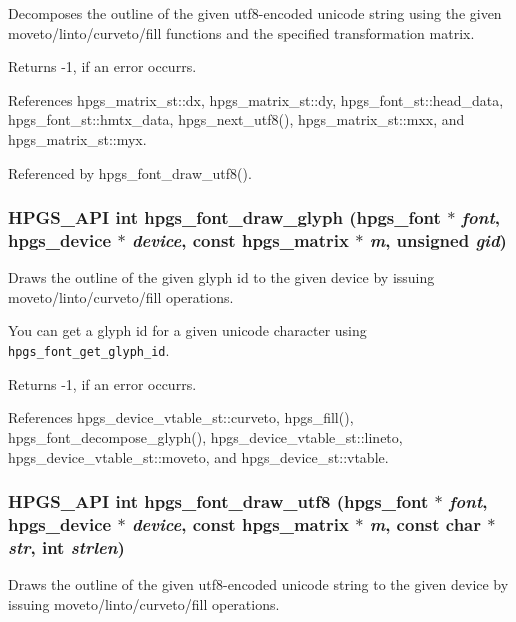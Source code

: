 Decomposes the outline of the given utf8-encoded unicode string using the given moveto/linto/curveto/fill functions and the specified transformation matrix.

Returns -1, if an error occurrs. 

References hpgs\_\-matrix\_\-st::dx, hpgs\_\-matrix\_\-st::dy, hpgs\_\-font\_\-st::head\_\-data, hpgs\_\-font\_\-st::hmtx\_\-data, hpgs\_\-next\_\-utf8(), hpgs\_\-matrix\_\-st::mxx, and hpgs\_\-matrix\_\-st::myx.

Referenced by hpgs\_\-font\_\-draw\_\-utf8().
\subsubsection[hpgs\_\-font\_\-draw\_\-glyph]{\setlength{\rightskip}{0pt plus 5cm}HPGS\_\-API int hpgs\_\-font\_\-draw\_\-glyph ({\bf hpgs\_\-font} $\ast$ {\em font}, \/  {\bf hpgs\_\-device} $\ast$ {\em device}, \/  const {\bf hpgs\_\-matrix} $\ast$ {\em m}, \/  unsigned {\em gid})}\label{group__font_ge8c95c21bbd2ee5ad75adf6ddcce6f4c}


Draws the outline of the given glyph id to the given device by issuing moveto/linto/curveto/fill operations.

You can get a glyph id for a given unicode character using {\tt hpgs\_\-font\_\-get\_\-glyph\_\-id}.

Returns -1, if an error occurrs. 

References hpgs\_\-device\_\-vtable\_\-st::curveto, hpgs\_\-fill(), hpgs\_\-font\_\-decompose\_\-glyph(), hpgs\_\-device\_\-vtable\_\-st::lineto, hpgs\_\-device\_\-vtable\_\-st::moveto, and hpgs\_\-device\_\-st::vtable.
\subsubsection[hpgs\_\-font\_\-draw\_\-utf8]{\setlength{\rightskip}{0pt plus 5cm}HPGS\_\-API int hpgs\_\-font\_\-draw\_\-utf8 ({\bf hpgs\_\-font} $\ast$ {\em font}, \/  {\bf hpgs\_\-device} $\ast$ {\em device}, \/  const {\bf hpgs\_\-matrix} $\ast$ {\em m}, \/  const char $\ast$ {\em str}, \/  int {\em strlen})}\label{group__font_g3bc1d462a0ac9cdbba24ef61cd25112b}


Draws the outline of the given utf8-encoded unicode string to the given device by issuing moveto/linto/curveto/fill operations.

